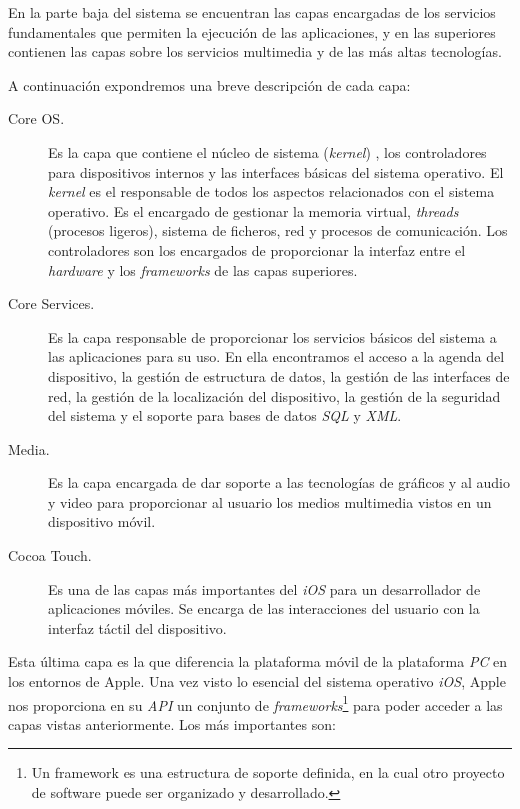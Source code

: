 En la parte baja del sistema se encuentran las capas encargadas de los
servicios fundamentales que permiten la ejecución de las aplicaciones,
y en las superiores contienen las capas sobre los servicios multimedia
y de las más altas tecnologías.
 

A continuación expondremos una breve descripción de cada capa:


\begin{description}
\item[Core OS.]  Es la capa que contiene el núcleo de
  sistema (\emph{kernel}) %
  , los controladores para dispositivos internos y las interfaces básicas del sistema
  operativo. El \emph{kernel} es el responsable de todos los aspectos
  relacionados con el sistema operativo. Es el encargado de gestionar
  la memoria virtual, \emph{threads} (procesos ligeros), sistema de ficheros,
  red y procesos de comunicación. Los controladores son los encargados
  de proporcionar la interfaz entre el \emph{hardware} y los \emph{frameworks} de
  las capas superiores.
\item[Core Services.] Es la capa responsable de proporcionar los
  servicios básicos del sistema a las aplicaciones para su uso. En
  ella encontramos el acceso a la agenda del dispositivo, la gestión
  de estructura de datos, la gestión de las interfaces de red, la
  gestión de la localización del dispositivo, la gestión de la seguridad
  del sistema y el soporte para bases de datos \emph{SQL} y \emph{XML}.
\item[Media.] Es la capa encargada de dar soporte a las
  tecnologías de gráficos y al audio y video para proporcionar al usuario
  los medios multimedia vistos en un dispositivo móvil.
\item[Cocoa Touch.]  Es una de las capas más importantes del \emph{iOS}
  para un desarrollador de aplicaciones móviles. Se encarga de las interacciones del usuario con la interfaz táctil del dispositivo. 
 \end{description}
  
  Esta última capa es la que diferencia la plataforma móvil de la plataforma \emph{PC} en los entornos de Apple. Una vez visto lo esencial del sistema operativo \emph{iOS}, Apple nos proporciona en su \emph{API} un conjunto de \emph{frameworks}\footnote{Un framework es una estructura de soporte definida, en la cual otro proyecto de software puede ser organizado y desarrollado.} para poder acceder a las capas vistas anteriormente. Los más importantes son:  


